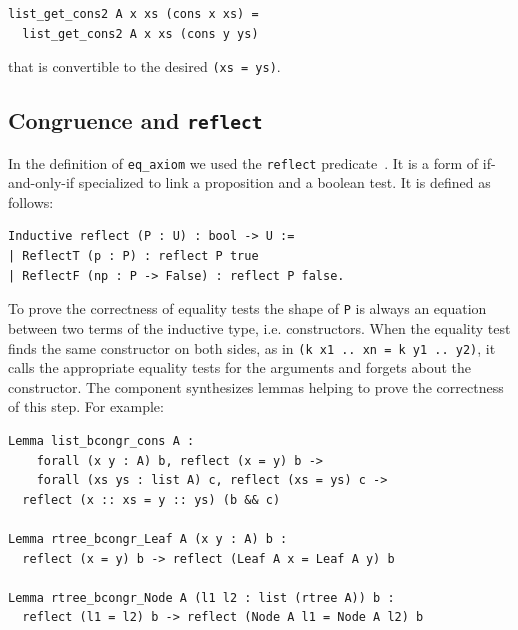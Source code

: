 \documentclass[sigplan,10pt,review]{acmart}\settopmatter{printfolios=true,printccs=false,printacmref=false}
\newcommand{\derive}[1]{\keys{#1}}
\begin{document}
\begin{minipage}{\textwidth}\begin{lstlisting}
list_get_cons2 A x xs (cons x xs) =
  list_get_cons2 A x xs (cons y ys)
\end{lstlisting}\end{minipage}

\noindent
that is convertible to the desired \lstinline+(xs = ys)+.

\subsection{Congruence and \lstinline+reflect+} %
\label{sec:reflect}

In the definition of \lstinline+eq_axiom+ we used the \lstinline+reflect+
predicate~\cite{mcb}. It is a form of if-and-only-if specialized to link a
proposition and a boolean test. It is defined as follows:

\begin{minipage}{\textwidth}\begin{lstlisting}
Inductive reflect (P : U) : bool -> U :=
| ReflectT (p : P) : reflect P true
| ReflectF (np : P -> False) : reflect P false.
\end{lstlisting}\end{minipage}

\noindent
To prove the correctness of equality tests the shape of
\lstinline+P+ is always an equation between two terms of
the inductive type, i.e. constructors.
When the equality test finds the same constructor on both sides, as in
\lstinline+(k x1 .. xn = k y1 .. y2)+, it
calls the appropriate equality tests for the arguments and forgets about
the constructor. The \derive{bcongr} component synthesizes lemmas
helping to prove the correctness of this step. For example:

\begin{minipage}{\textwidth}\begin{lstlisting}
Lemma list_bcongr_cons A :
    forall (x y : A) b, reflect (x = y) b ->
    forall (xs ys : list A) c, reflect (xs = ys) c ->
  reflect (x :: xs = y :: ys) (b && c)

Lemma rtree_bcongr_Leaf A (x y : A) b :
  reflect (x = y) b -> reflect (Leaf A x = Leaf A y) b

Lemma rtree_bcongr_Node A (l1 l2 : list (rtree A)) b :
  reflect (l1 = l2) b -> reflect (Node A l1 = Node A l2) b
\end{lstlisting}\end{minipage}
\end{document}
